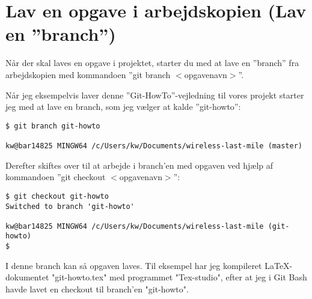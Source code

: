\documentclass[11pt,a4paper,twoside]{report}
\begin{document}
\section{Lav en opgave i arbejdskopien (Lav en ''branch'')}
Når der skal laves en opgave i projektet, starter du med at lave en ''branch'' fra arbejdskopien med kommandoen ''git branch $<$opgavenavn$>$''.
\par
Når jeg eksempelvis laver denne ''Git-HowTo''-vejledning til vores projekt starter jeg med at lave en branch, som jeg vælger at kalde ''git-howto'':
\begin{verbatim}
$ git branch git-howto

kw@bar14825 MINGW64 /c/Users/kw/Documents/wireless-last-mile (master)
\end{verbatim}

Derefter skiftes over til at arbejde i branch'en med opgaven ved hjælp af kommandoen ''git checkout $<$opgavenavn$>$'':
\begin{verbatim}
$ git checkout git-howto
Switched to branch 'git-howto'

kw@bar14825 MINGW64 /c/Users/kw/Documents/wireless-last-mile (git-howto)
$
\end{verbatim}
I denne branch kan så opgaven laves. Til eksempel har jeg kompileret \LaTeX-dokumentet "git-howto.tex" med programmet "Tex-studio", efter at jeg i Git Bash havde lavet en checkout til branch'en "git-howto".
\end{document}
